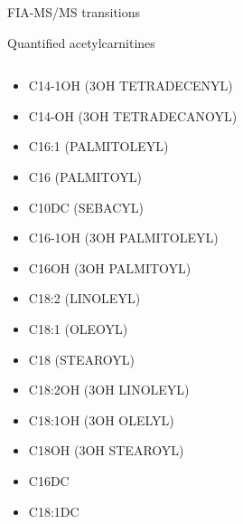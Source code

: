 \documentclass[presentation, smaller]{beamer}
\begin{document}
\begin{frame}[label={sec:orgheadline17}]{FIA-MS/MS transitions}
\begin{block}{Quantified acetylcarnitines}
\begin{columns}
\begin{column}{0.33\columnwidth}
\begin{itemize}
\item C14-1OH (3OH TETRADECENYL)
\item C14-OH (3OH TETRADECANOYL)
\item C16:1 (PALMITOLEYL)
\item C16 (PALMITOYL)
\item C10DC (SEBACYL)
\item C16-1OH (3OH PALMITOLEYL)
\item C16OH (3OH PALMITOYL)
\item C18:2 (LINOLEYL)
\item C18:1 (OLEOYL)
\item C18 (STEAROYL)
\item C18:2OH (3OH LINOLEYL)
\item C18:1OH (3OH OLELYL)
\item C18OH (3OH STEAROYL)
\item C16DC
\item C18:1DC
\end{itemize}
\end{column}
\end{columns}
\end{block}
\end{frame}
\end{document}
